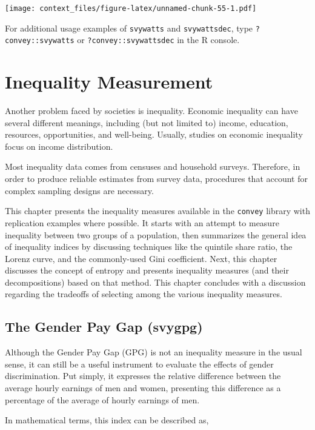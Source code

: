 \documentclass[
]{book}
\begin{document}
\texttt{[image: context\_files/figure-latex/unnamed-chunk-55-1.pdf]}

For additional usage examples of \texttt{svywatts} and \texttt{svywattsdec}, type \texttt{?convey::svywatts} or \texttt{?convey::svywattsdec} in the R console.

\hypertarget{inequality}{%
\chapter{Inequality Measurement}\label{inequality}}

Another problem faced by societies is inequality. Economic inequality can have several different meanings, including (but not limited to) income, education, resources, opportunities, and well-being. Usually, studies on economic inequality focus on income distribution.

Most inequality data comes from censuses and household surveys. Therefore, in order to produce reliable estimates from survey data, procedures that account for complex sampling designs are necessary.

This chapter presents the inequality measures available in the \texttt{convey} library with replication examples where possible. It starts with an attempt to measure inequality between two groups of a population, then summarizes the general idea of inequality indices by discussing techniques like the quintile share ratio, the Lorenz curve, and the commonly-used Gini coefficient. Next, this chapter discusses the concept of entropy and presents inequality measures (and their decompositions) based on that method. This chapter concludes with a discussion regarding the tradeoffs of selecting among the various inequality measures.

\hypertarget{the-gender-pay-gap-svygpg}{%
\section{The Gender Pay Gap (svygpg)}\label{the-gender-pay-gap-svygpg}}

Although the Gender Pay Gap (GPG) is not an inequality measure in the usual sense, it can still be a useful instrument to evaluate the effects of gender discrimination. Put simply, it expresses the relative difference between the average hourly earnings of men and women, presenting this difference as a percentage of the average of hourly earnings of men.

In mathematical terms, this index can be described as,
\end{document}
